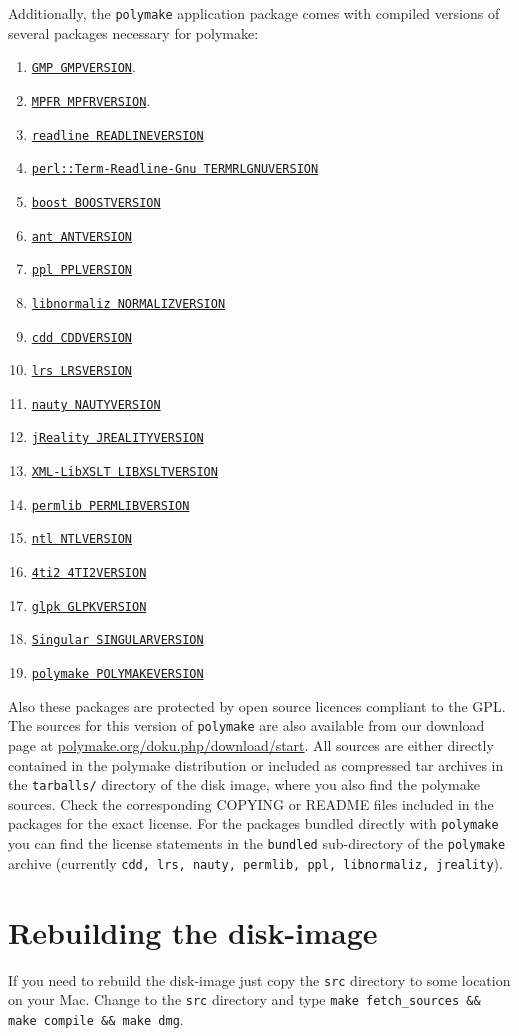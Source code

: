 \documentclass[a4paper]{amsart}
\newcommand{\polymake}{\texttt{polymake}\xspace}
\begin{document}
Additionally, the \polymake application package comes with compiled
versions of several packages necessary for polymake: 
\begin{enumerate}
\item \href{GMPHOME}{\texttt{GMP GMPVERSION}}.
\item \href{MPFRHOME}{\texttt{MPFR MPFRVERSION}}.
\item \href{READLINEHOME}{\texttt{readline READLINEVERSION}}
\item \href{TERMRLGNUHOME}{\texttt{perl::Term-Readline-Gnu TERMRLGNUVERSION}}
\item \href{BOOSTHOME}{\texttt{boost BOOSTVERSION}}
\item \href{ANTHOME}{\texttt{ant ANTVERSION}}
\item \href{PPLHOME}{\texttt{ppl PPLVERSION}}
\item \href{NORMALIZHOME}{\texttt{libnormaliz NORMALIZVERSION}}
\item \href{CDDHOME}{\texttt{cdd CDDVERSION}}
\item \href{LRSHOME}{\texttt{lrs LRSVERSION}}
\item \href{NAUTYHOME}{\texttt{nauty NAUTYVERSION}}
\item \href{JREALITYHOME}{\texttt{jReality JREALITYVERSION}}
\item \href{LIBXSLTHOME}{\texttt{XML-LibXSLT LIBXSLTVERSION}}
\item \href{PERMLIBHOME}{\texttt{permlib PERMLIBVERSION}}
\item \href{NTLHOME}{\texttt{ntl NTLVERSION}}
\item \href{4TI2HOME}{\texttt{4ti2 4TI2VERSION}}
\item \href{GLPKHOME}{\texttt{glpk GLPKVERSION}}
\item \href{SINGULARHOME}{\texttt{Singular SINGULARVERSION}}
\item \href{POLYMAKEHOME}{\texttt{polymake POLYMAKEVERSION}}
\end{enumerate}
Also these packages are protected by open source licences compliant to
the GPL. The sources for this version of \polymake are also available from our download page at  \href{http://polymake.org/doku.php/download/start}{polymake.org/doku.php/download/start}. 
All sources are either directly contained in the 
polymake distribution or included as compressed tar archives in the
\texttt{tarballs/} directory of the disk image, where you also find the polymake sources. Check the
corresponding COPYING or README files included in the packages for the
exact license.  For the packages bundled directly with \polymake you
can find the license statements in the \texttt{bundled} sub-directory
of the \polymake archive (currently \texttt{cdd, lrs, nauty, permlib, ppl, libnormaliz, jreality}).

\section*{Rebuilding the disk-image}

If you need to rebuild the disk-image just copy the \texttt{src}
directory to some location on your Mac. Change to the \texttt{src}
directory and type \texttt{make fetch\_sources \&\& make compile \&\& make dmg}.
\end{document}

